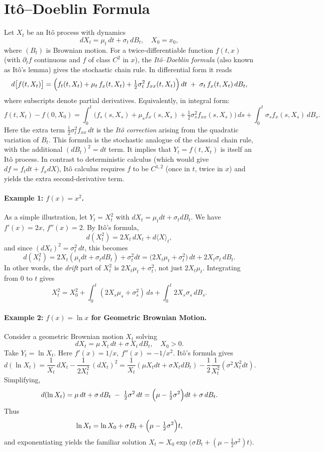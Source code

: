 \section{It\^o--Doeblin Formula}
Let $X_t$ be an It\^o process with dynamics 
\[
  dX_t = \mu_t\,dt + \sigma_t\,dB_t, \quad X_0 = x_0,
\]
where $(B_t)$ is Brownian motion.  For a twice-differentiable function $f(t,x)$ (with $\partial_t f$ continuous and $f$ of class $C^2$ in $x$), the {\em It\^o–Doeblin formula} (also known as It\^o's lemma) gives the stochastic chain rule.  In differential form it reads 
\[
  d\bigl[f(t,X_t)\bigr]
  = \Bigl(f_t(t,X_t) + \mu_t\,f_x(t,X_t) + \tfrac12\sigma_t^2\,f_{xx}(t,X_t)\Bigr)\,dt 
    \;+\;\sigma_t\,f_x(t,X_t)\,dB_t,
\] 
where subscripts denote partial derivatives.  Equivalently, in integral form: 
{\small
\[
  f(t,X_t) - f(0,X_0)
  = \int_0^t\bigl(f_s(s,X_s) + \mu_s f_x(s,X_s) + \tfrac{1}{2} \sigma_s^2 f_{xx}(s,X_s)\bigr)\,ds
  + \int_0^t \sigma_s f_x(s,X_s)\,dB_s.
\]
}
Here the extra term $\tfrac12\sigma_t^2 f_{xx}\,dt$ is the {\em It\^o correction} arising from the quadratic variation of $B_t$.  This formula is the stochastic analogue of the classical chain rule, with the additional $(dB_t)^2 = dt$ term.  It implies that $Y_t=f(t,X_t)$ is itself an It\^o process. In contrast to deterministic calculus (which would give $d f = f_t dt + f_x dX$), It\^o calculus requires $f$ to be $C^{1,2}$ (once in $t$, twice in $x$) and yields the extra second-derivative term.

\paragraph{Example 1: $f(x)=x^2$.}  As a simple illustration, let $Y_t=X_t^2$ with $dX_t=\mu_tdt+\sigma_t dB_t$.  We have $f'(x)=2x$, $f''(x)=2$.  By It\^o's formula,
\[
  d(X_t^2) = 2X_t\,dX_t + d\langle X\rangle_t,
\]
and since $(dX_t)^2 = \sigma_t^2\,dt$, this becomes 
\[
  d(X_t^2) = 2X_t(\mu_tdt + \sigma_t dB_t) + \sigma_t^2 dt 
           = \bigl(2X_t\mu_t + \sigma_t^2\bigr)\,dt + 2X_t\sigma_t\,dB_t.
\]
In other words, the {\em drift} part of $X_t^2$ is $2X_t\mu_t+\sigma_t^2$, not just $2X_t\mu_t$.  Integrating from $0$ to $t$ gives 
\[
  X_t^2 = X_0^2 + \int_0^t(2X_s\mu_s + \sigma_s^2)\,ds + \int_0^t 2X_s\sigma_s\,dB_s.
\]

\paragraph{Example 2: $f(x)=\ln x$ for Geometric Brownian Motion.}  Consider a geometric Brownian motion $X_t$ solving 
\[
  dX_t = \mu\,X_t\,dt + \sigma\,X_t\,dB_t,\quad X_0>0.
\]
Take $Y_t = \ln X_t$.  Here $f'(x)=1/x,\ f''(x)=-1/x^2$.  It\^o's formula gives
\[
  d(\ln X_t) = \frac{1}{X_t}\,dX_t - \frac{1}{2X_t^2}\,(dX_t)^2
  = \frac{1}{X_t}(\mu X_t dt + \sigma X_t dB_t) - \frac12\frac{1}{X_t^2}(\sigma^2 X_t^2 dt).
\]
Simplifying,
\[
  d(\ln X_t) = \mu\,dt + \sigma\,dB_t \;-\; \tfrac12\sigma^2\,dt
            = \Bigl(\mu - \tfrac12\sigma^2\Bigr)dt + \sigma\,dB_t.
\]
Thus 
\[
  \ln X_t = \ln X_0 + \sigma B_t + \Bigl(\mu - \tfrac12\sigma^2\Bigr)t,
\]
and exponentiating yields the familiar solution 
$X_t = X_0 \exp\bigl(\sigma B_t + (\mu-\tfrac12\sigma^2)t\bigr)$. 

